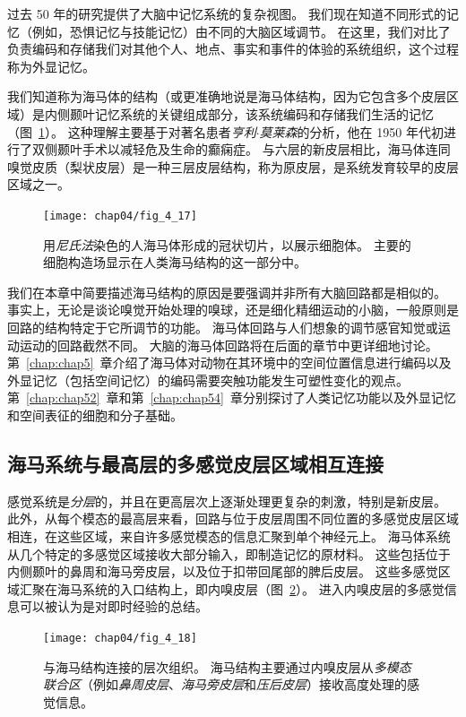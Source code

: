 过去 50 年的研究提供了大脑中记忆系统的复杂视图。 
我们现在知道不同形式的记忆（例如，恐惧记忆与技能记忆）由不同的大脑区域调节。
在这里，我们对比了负责编码和存储我们对其他个人、地点、事实和事件的体验的系统组织，这个过程称为外显记忆。


我们知道称为海马体的结构（或更准确地说是海马体结构，因为它包含多个皮层区域）是内侧颞叶记忆系统的关键组成部分，该系统编码和存储我们生活的记忆（图~\ref{fig:4_17}）。 
这种理解主要基于对著名患者\textit{亨利$\cdot$莫莱森}的分析，他在 1950 年代初进行了双侧颞叶手术以减轻危及生命的癫痫症。
与六层的新皮层相比，海马体连同嗅觉皮质（梨状皮层）是一种三层皮层结构，称为原皮层，是系统发育较早的皮层区域之一。


\begin{figure}[htbp]
	\centering
	\texttt{[image: chap04/fig\_4\_17]}
	\caption{用\textit{尼氏法}染色的人海马体形成的冠状切片，以展示细胞体。
		主要的细胞构造场显示在人类海马结构的这一部分中。}
	\label{fig:4_17}
\end{figure}


我们在本章中简要描述海马结构的原因是要强调并非所有大脑回路都是相似的。
事实上，无论是谈论嗅觉开始处理的嗅球，还是细化精细运动的小脑，一般原则是回路的结构特定于它所调节的功能。
海马体回路与人们想象的调节感官知觉或运动运动的回路截然不同。
大脑的海马体回路将在后面的章节中更详细地讨论。 
第~\ref{chap:chap5}~章介绍了海马体对动物在其环境中的空间位置信息进行编码以及外显记忆（包括空间记忆）的编码需要突触功能发生可塑性变化的观点。 
第~\ref{chap:chap52}~章和第~\ref{chap:chap54}~章分别探讨了人类记忆功能以及外显记忆和空间表征的细胞和分子基础。



\subsection{海马系统与最高层的多感觉皮层区域相互连接}

感觉系统是\textit{分层}的，并且在更高层次上逐渐处理更复杂的刺激，特别是新皮层。
此外，从每个模态的最高层来看，回路与位于皮层周围不同位置的多感觉皮层区域相连，在这些区域，来自许多感觉模态的信息汇聚到单个神经元上。
海马体系统从几个特定的多感觉区域接收大部分输入，即制造记忆的原材料。
这些包括位于内侧颞叶的鼻周和海马旁皮层，以及位于扣带回尾部的脾后皮层。
这些多感觉区域汇聚在海马系统的入口结构上，即内嗅皮层（图~\ref{fig:4_18}）。 
进入内嗅皮层的多感觉信息可以被认为是对即时经验的总结。


\begin{figure}[htbp]
	\centering
	\texttt{[image: chap04/fig\_4\_18]}
	\caption{与海马结构连接的层次组织。
		海马结构主要通过内嗅皮层从\textit{多模态联合区}（例如\textit{鼻周皮层}、\textit{海马旁皮层}和\textit{压后皮层}）接收高度处理的感觉信息。}
	\label{fig:4_18}
\end{figure}



